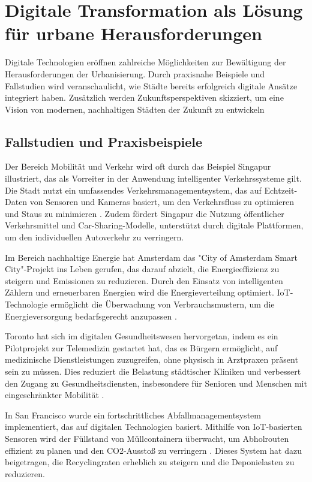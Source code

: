 \documentclass[conference,compsoc,final,a4paper, onecolumn, 11pt]{IEEEtran}
\begin{document}
\section{Digitale Transformation als Lösung für urbane Herausforderungen}
Digitale Technologien eröffnen zahlreiche Möglichkeiten zur Bewältigung der Herausforderungen der Urbanisierung. 
Durch praxisnahe Beispiele und Fallstudien wird veranschaulicht, wie Städte bereits erfolgreich digitale Ansätze integriert haben. 
Zusätzlich werden Zukunftsperspektiven skizziert, um eine Vision von modernen, nachhaltigen Städten der Zukunft zu entwickeln

\subsection{Fallstudien und Praxisbeispiele}
Der Bereich Mobilität und Verkehr wird oft durch das Beispiel Singapur illustriert, das als Vorreiter in der Anwendung intelligenter Verkehrssysteme gilt. 
Die Stadt nutzt ein umfassendes Verkehrsmanagementsystem, das auf Echtzeit-Daten von Sensoren und Kameras basiert, um den Verkehrsfluss zu optimieren und Staus zu minimieren \autocite{Chin2020}. 
Zudem fördert Singapur die Nutzung öffentlicher Verkehrsmittel und Car-Sharing-Modelle, unterstützt durch digitale Plattformen, um den individuellen Autoverkehr zu verringern.

Im Bereich nachhaltige Energie hat Amsterdam das "City of Amsterdam Smart City"-Projekt ins Leben gerufen, das darauf abzielt, die Energieeffizienz zu steigern und Emissionen zu reduzieren. 
Durch den Einsatz von intelligenten Zählern und erneuerbaren Energien wird die Energieverteilung optimiert. 
\ac{IoT}-Technologie ermöglicht die Überwachung von Verbrauchsmustern, um die Energieversorgung bedarfsgerecht anzupassen \autocite{Amsterdam2021}.

Toronto hat sich im digitalen Gesundheitswesen hervorgetan, indem es ein Pilotprojekt zur Telemedizin gestartet hat, das es Bürgern ermöglicht, auf medizinische Dienstleistungen zuzugreifen, ohne physisch in Arztpraxen präsent sein zu müssen. 
Dies reduziert die Belastung städtischer Kliniken und verbessert den Zugang zu Gesundheitsdiensten, insbesondere für Senioren und Menschen mit eingeschränkter Mobilität \autocite{Doe2022}.

In San Francisco wurde ein fortschrittliches Abfallmanagementsystem implementiert, das auf digitalen Technologien basiert. 
Mithilfe von \ac{IoT}-basierten Sensoren wird der Füllstand von Müllcontainern überwacht, um Abholrouten effizient zu planen und den CO2-Ausstoß zu verringern \autocite{Jones2019}. 
Dieses System hat dazu beigetragen, die Recyclingraten erheblich zu steigern und die Deponielasten zu reduzieren.
\end{document}
